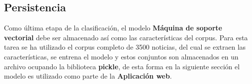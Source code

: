 \subsection{Persistencia}


Como última etapa de la clasificación, el modelo \textbf{Máquina de soporte vectorial} debe ser almacenado así como las características del corpus. Para esta tarea se ha utilizado el corpus completo de 3500 noticias, del cual se extraen las características, se entrena el modelo y estos conjuntos son almacenados en un archivo ocupando la biblioteca \textbf{pickle}, de esta forma en la siguiente sección el modelo es utilizado como parte de la \textbf{Aplicación web}.




